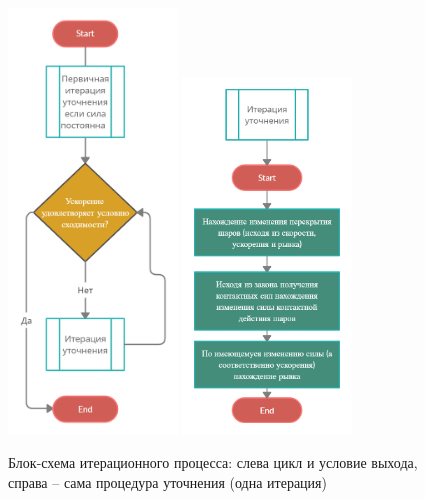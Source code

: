 \documentclass[a4paper]{article}
\begin{document}
\begin{figure}[H]
	\centering
	\includegraphics[width=0.4\textwidth]{iter_cicle} 
	\includegraphics[width=0.4\textwidth]{iter_one}
	\caption{Блок-схема итерационного процесса: слева цикл и условие выхода, справа -- сама процедура уточнения (одна итерация)}
	\label{pic:iter}
\end{figure} 
\end{document}
